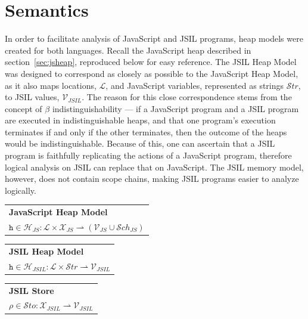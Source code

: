 \documentclass[a4paper,11pt,twoside]{report}
\begin{document}
\section{Semantics}
In order to facilitate analysis of JavaScript and JSIL programs, heap models were created for both languages. Recall the JavaScript heap described in section~\ref{sec:jsheap}, reproduced below for easy reference. The JSIL Heap Model was designed to correspond as closely as possible to the JavaScript Heap Model, as it also maps locations, $\mathcal{L}$, and JavaScript variables, represented as strings $\mathcal{S}tr$, to JSIL values, $\mathcal{V}_{JSIL}$. The reason for this close correspondence stems from the concept of $\beta$ indistinguishability --- if a JavaScript program and a JSIL program are executed in indistinguishable heaps, and that one program's execution terminates if and only if the other terminates, then the outcome of the heaps would be indistinguishable. Because of this, one can ascertain that a JSIL program is faithfully replicating the actions of a JavaScript program, therefore logical analysis on JSIL can replace that on JavaScript. The JSIL memory model, however, does not contain scope chains, making JSIL programs easier to analyze logically.

\begin{center}
\begin{tabular}{p{8cm}}
\textbf{JavaScript Heap Model} \\
$\texttt{h} \in \mathcal{H}_{JS} : \mathcal{L} \times \mathcal{X}_{JS} \rightharpoonup (\mathcal{V}_{JS} \cup \mathcal{S}ch_{JS})$  \\
\end{tabular}

\vspace{0.3cm}
\begin{tabular}{p{8cm}}
\textbf{JSIL Heap Model} \\
$\texttt{h} \in \mathcal{H}_{JSIL} : \mathcal{L} \times \mathcal{S}tr \rightharpoonup \mathcal{V}_{JSIL}  $  \\
\end{tabular}

\vspace{0.3cm}
\begin{tabular}{p{8cm}}
\textbf{JSIL Store} \\
$\rho \in \mathcal{S}to : \mathcal{X}_{JSIL} \rightharpoonup \mathcal{V}_{JSIL}  $  \\
\end{tabular}
\end{center}
\end{document}
